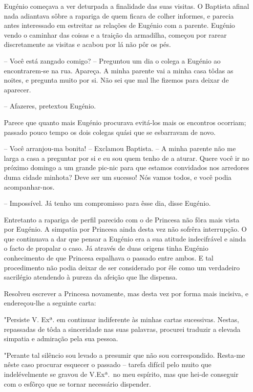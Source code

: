 \documentclass[9pt]{article}
\begin{document}
Eugé\-nio começava a ver deturpada a finalidade das suas visitas.
O Baptista afinal nada adiantava sôbre a rapariga de quem fi\-cara de
co\-lher informes, e parecia antes interessado em estreitar as rela\-ções
de Eugé\-nio com a parente. Eugé\-nio vendo o caminhar das coisas e a trai\-ção da armadi\-lha, começou
por rarear discretamente as visitas e acabou por lá não pôr os pés.

-- Você está zangado comigo? -- Preguntou um dia o colega a Eugé\-nio
ao encontrarem-se na rua. Apareça. A minha parente vai a minha casa
tôdas as noites, e pregunta muito por si. Não sei que mal lhe fizemos
para deixar de aparecer.

-- Afazeres, pretextou Eugé\-nio.

Parece que quanto mais Eugé\-nio procurava evitá-los mais os encontros ocorriam; passado pouco tempo os dois colegas quási que se
esbarravam de novo.

-- Você arranjou-ma bonita! -- Exclamou Baptista. -- A minha parente
não me larga a casa a preguntar por si e eu sou quem tenho de a aturar. Quere você ir no próximo domingo a um gran\-de pic-nic para que
estamos convidados nos arredores duma cidade minhota? Deve ser um
sucesso! Nós vamos todos, e você podia acompanhar-nos.

-- Impossível. Já tenho um compromisso para êsse dia, disse Eugé\-nio.

Entretanto a rapariga de perfil parecido com o de Princesa não fôra
mais vista por Eugé\-nio. A simpatia por Princesa ainda desta vez não
sofrêra interrup\-ção. O que continuava a dar que pensar a Eugé\-nio era
a sua atitude indecifrável e ainda o facto de propalar o caso. Já através de duas origens tinha Eugé\-nio conhecimento de que Princesa espa\-lhava o passado entre ambos. E tal procedimento não podia deixar de
ser considerado por êle como um verdadeiro sacrilégio atendendo à
pureza da afei\-ção que lhe dispensa.

Resolveu escrever a Princesa novamente, mas desta vez por forma
mais incisiva, e endereçou-\-lhe a seguinte carta:

"Persiste V. Exª. em continuar indiferente às minhas cartas
sucessivas. Nestas, repassadas de tôda a sinceridade nas suas palavras, procurei traduzir a elevada simpatia e admira\-ção pela sua pessoa.

"Perante tal silêncio sou levado a presumir que não sou correspondido. Resta-me nês\-te caso procurar esque\-cer o passado -- tarefa difícil pelo muito que indelévelmente se gravou de V.Exª.\ no meu espírito,
mas que hei-de conseguir com o esfôrço que se tornar necessário dispender.
\end{document}
